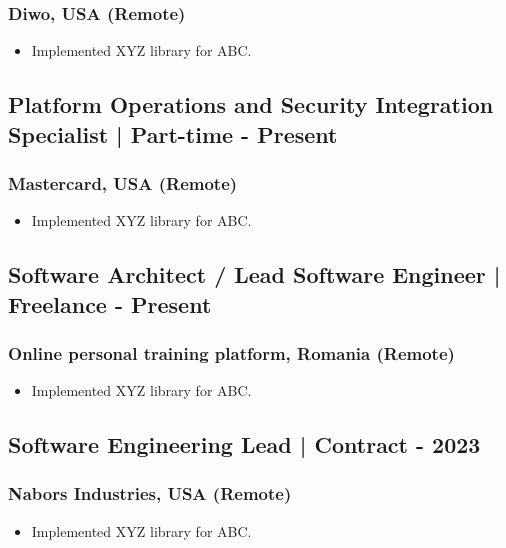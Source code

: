 \documentclass[11pt]{article}
\begin{document}
    \subsubsection{Diwo, USA (Remote)}
    \begin{itemize}
        \item[\checkmark]  Implemented XYZ library for ABC.
    \end{itemize}
    
    \subsection{Platform Operations and Security Integration Specialist | Part-time \hfill {} - Present}
    \subsubsection{Mastercard, USA (Remote)}
    \begin{itemize}
        \item[\checkmark]  Implemented XYZ library for ABC.
    \end{itemize}
    
    \subsection{Software Architect / Lead Software Engineer | Freelance \hfill {} - Present}
    \subsubsection{Online personal training platform, Romania (Remote)}
    \begin{itemize}
        \item[\checkmark]  Implemented XYZ library for ABC.
    \end{itemize}
    
    \subsection{Software Engineering Lead | Contract \hfill {} - 2023}
    \subsubsection{Nabors Industries, USA (Remote)}
    \begin{itemize}
        \item[\checkmark]  Implemented XYZ library for ABC.
    \end{itemize}
    
\end{document}
